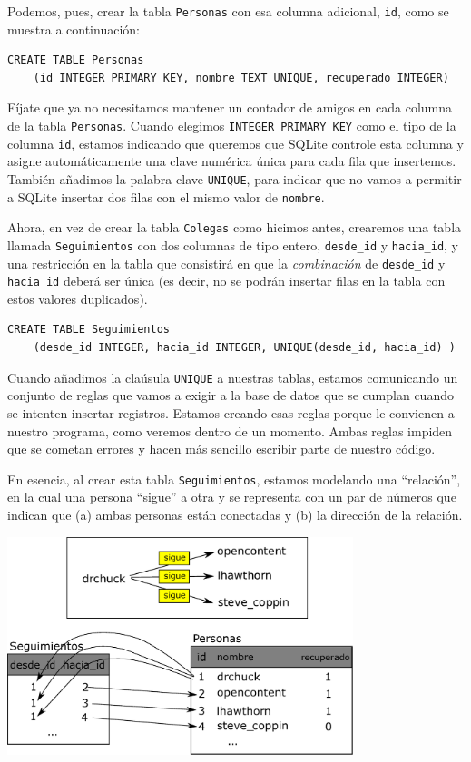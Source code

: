 Podemos, pues, crear la tabla {\tt Personas} con esa columna adicional,
{\tt id}, como se muestra a continuación:

\beforeverb
\begin{verbatim}
CREATE TABLE Personas
    (id INTEGER PRIMARY KEY, nombre TEXT UNIQUE, recuperado INTEGER)
\end{verbatim}
\afterverb
%
Fíjate que ya no necesitamos mantener un contador de amigos en cada columna
de la tabla {\tt Personas}.
Cuando elegimos {\tt INTEGER PRIMARY KEY} como el tipo de la columna {\tt id},
estamos indicando que queremos que SQLite controle esta columna y
asigne automáticamente una clave numérica única para cada fila que insertemos.
También añadimos la palabra clave {\tt UNIQUE}, para indicar que no vamos
a permitir a SQLite insertar dos filas con el mismo valor de {\tt nombre}.

Ahora, en vez de crear la tabla {\tt Colegas} como hicimos antes, crearemos
una tabla llamada {\tt Seguimientos} con dos columnas de tipo entero,
\verb"desde_id" y \verb"hacia_id", y una restricción en la tabla que consistirá en que
la \emph{combinación} de \verb"desde_id" y \verb"hacia_id" deberá ser única
(es decir, no se podrán insertar filas en la tabla con estos valores duplicados).

\beforeverb
\begin{verbatim}
CREATE TABLE Seguimientos 
    (desde_id INTEGER, hacia_id INTEGER, UNIQUE(desde_id, hacia_id) )
\end{verbatim}
\afterverb
%
Cuando añadimos la claúsula {\tt UNIQUE} a nuestras tablas, estamos comunicando un conjunto
de reglas que vamos a exigir a la base de datos que se cumplan cuando se intenten insertar
registros. Estamos creando esas reglas porque le convienen a nuestro programa, como
veremos dentro de un momento. Ambas reglas impiden que se cometan errores y hacen
más sencillo escribir parte de nuestro código.

En esencia, al crear esta tabla {\tt Seguimientos}, estamos modelando una
``relación'', en la cual una persona ``sigue'' a otra
y se representa con un par de números que indican que (a) ambas personas están
conectadas y (b) la dirección de la relación.

\beforefig
\centerline{\includegraphics[height=2.50in]{figs2/twitter.eps}}
\afterfig



